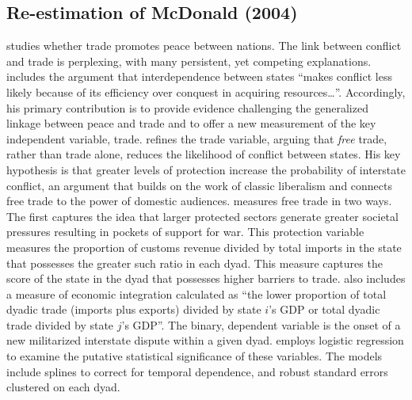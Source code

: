 \subsection{Re-estimation of McDonald (2004)}

\citet{mcdonald:2004} studies whether trade promotes peace between nations. The link between conflict and trade is perplexing, with many persistent, yet competing explanations. \citet[p. 547]{mcdonald:2004} includes the argument that interdependence between states ``makes conflict less likely because of its efficiency over conquest in acquiring resources\ldots''. Accordingly, his primary contribution is to provide evidence challenging the generalized linkage between peace and trade and to offer a new measurement of the key independent variable, trade. \citet{mcdonald:2004} refines the trade variable, arguing that \textit{free} trade, rather than trade alone, reduces the likelihood of conflict between states. His key hypothesis is that greater levels of protection increase the probability of interstate conflict, an argument that builds on the work of classic liberalism and connects free trade to the power of domestic audiences. \citet{mcdonald:2004} measures free trade in two ways. The first captures the idea that larger protected sectors generate greater societal pressures resulting in pockets of support for war. This protection variable measures the proportion of customs revenue divided by total imports in the state that possesses the greater such ratio in each dyad. This measure captures the score of the state in the dyad that possesses higher barriers to trade. \citet[p. 560]{mcdonald:2004} also includes a measure of economic integration  calculated as ``the lower proportion of total dyadic trade (imports plus exports) divided by state $i$'s GDP or total dyadic trade divided by state $j$'s GDP''. The binary, dependent variable is the onset of a new militarized interstate dispute within a given dyad. \citet{mcdonald:2004} employs logistic regression to examine the putative statistical significance of these variables. The models include splines to correct for temporal dependence, and robust standard errors clustered on each dyad.

